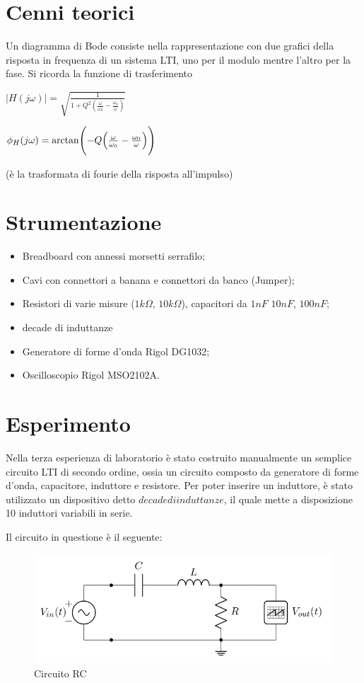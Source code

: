     \section{Cenni teorici}
    Un diagramma di Bode consiste nella rappresentazione con due grafici della risposta in frequenza di un sistema LTI, 
    uno per il modulo mentre l'altro per la fase.
    Si ricorda la funzione di trasferimento \par 
    $\left\lvert H(j\omega) \right\rvert = \sqrt{\frac{1}{1 + Q^2(\frac{\omega}{\omega_0} - \frac{\omega_0}{\omega} )} } $ \par
    $\phi_H(j\omega) = \arctan \Biggl(-Q\Bigl(\frac{\omega}{\omega_0} - \frac{\omega_0}{\omega} \Bigr)\Biggr)$ \par
    (è la trasformata di fourie della risposta all'impulso)

    \section{Strumentazione}
    \begin{itemize}
        \item Breadboard con annessi morsetti serrafilo;
        \item Cavi con connettori a banana e connettori da banco (Jumper);
        \item Resistori di varie misure ($1k\Omega$, $10k\Omega$), capacitori da $1nF$ $10nF$, $100nF$;
        \item decade di induttanze
        \item Generatore di forme d'onda Rigol DG1032;
        \item Oscilloscopio Rigol MSO2102A.
    \end{itemize}

    \section{Esperimento}
    Nella terza esperienza di laboratorio è stato costruito manualmente un semplice circuito LTI di secondo ordine, ossia
    un circuito composto da generatore di forme d'onda, capacitore, induttore e resistore. Per poter inserire un induttore, è stato utilizzato un dispositivo
    detto $decade di induttanze$, il quale mette a disposizione 10 induttori variabili in serie. \par
    Il circuito in questione è il seguente:\par

    \begin{figure}[!h]
        \begin{center}
            \includegraphics[width = 6 cm]{circuito.png}
            \caption{Circuito RC}
        \end{center}
    \end{figure}

